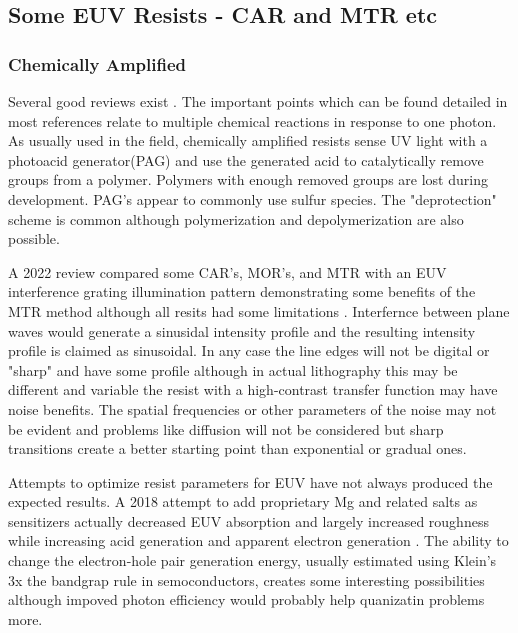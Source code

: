\subsection{Some EUV Resists - CAR and MTR etc}

\subsubsection{Chemically Amplified  }

Several good reviews exist
\cite{Ito_Chemical_Amplification_Resists_2005}.
The important points which can be found detailed in most
references relate to multiple chemical reactions in response to
one photon. 
As usually used in the field, chemically amplified resists
sense UV light with a photoacid generator(PAG) and use the
generated acid to catalytically remove groups from a 
polymer. Polymers with enough removed groups are lost
during development.  PAG's appear to commonly use sulfur species.
The "deprotection" scheme is common although polymerization and
depolymerization are also possible. 

A 2022 review compared some CAR's, MOR's, and MTR with an EUV interference
grating illumination pattern demonstrating some benefits of the MTR 
method although all resits had some limitations
\cite{DouglasGuerreroadditionalGillesRAmblard_lithography_resist_2023}.
Interfernce between plane waves would generate a sinusidal intensity
profile and the resulting intensity profile is claimed as
sinusoidal. In any case the line
edges will not be digital or "sharp" and have some profile 
although in actual lithography this may be different and variable
the resist with a high-contrast transfer function may have 
noise benefits. The spatial frequencies or other parameters of the
noise may not be evident and problems like diffusion will not
be considered but sharp transitions create a better starting point
than exponential or gradual ones. 

Attempts to optimize resist parameters for EUV have not always
produced the expected results. A 2018 attempt to add proprietary Mg
and related salts as sensitizers actually decreased EUV absorption
and largely increased roughness while increasing acid generation
and apparent electron generation
\cite{Vesters_Jiang_Yamamoto_Sensitizers_extreme_ultraviolet_2018}.
The ability to change the electron-hole pair generation energy,
usually estimated using Klein's 3x the bandgrap rule in semoconductors,
creates some interesting possibilities although impoved photon
efficiency would probably help quanizatin problems more.


